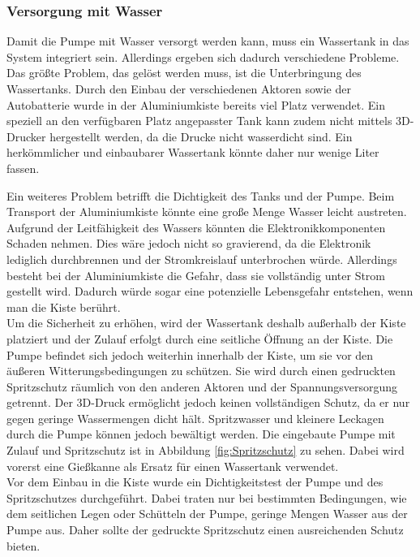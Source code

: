 \subsubsection{Versorgung mit Wasser}

Damit die Pumpe mit Wasser versorgt werden kann, muss ein Wassertank in das System integriert sein. Allerdings ergeben sich dadurch verschiedene Probleme.
\\
Das größte Problem, das gelöst werden muss, ist die Unterbringung des Wassertanks. Durch den Einbau der verschiedenen Aktoren sowie der Autobatterie wurde in der Aluminiumkiste bereits viel Platz verwendet. Ein speziell an den verfügbaren Platz angepasster Tank kann zudem nicht mittels 3D-Drucker hergestellt werden, da die Drucke nicht wasserdicht sind. Ein herkömmlicher und einbaubarer Wassertank könnte daher nur wenige Liter fassen.

Ein weiteres Problem betrifft die Dichtigkeit des Tanks und der Pumpe. Beim Transport der Aluminiumkiste könnte eine große Menge Wasser leicht austreten. Aufgrund der Leitfähigkeit des Wassers könnten die Elektronikkomponenten Schaden nehmen. Dies wäre jedoch nicht so gravierend, da die Elektronik lediglich durchbrennen und der Stromkreislauf unterbrochen würde. Allerdings besteht bei der Aluminiumkiste die Gefahr, dass sie vollständig unter Strom gestellt wird. Dadurch würde sogar eine potenzielle Lebensgefahr entstehen, wenn man die Kiste berührt.
\\
Um die Sicherheit zu erhöhen, wird der Wassertank deshalb außerhalb der Kiste platziert und der Zulauf erfolgt durch eine seitliche Öffnung an der Kiste. Die Pumpe befindet sich jedoch weiterhin innerhalb der Kiste, um sie vor den äußeren Witterungsbedingungen zu schützen. Sie wird durch einen gedruckten Spritzschutz räumlich von den anderen Aktoren und der Spannungsversorgung getrennt. Der 3D-Druck ermöglicht jedoch keinen vollständigen Schutz, da er nur gegen geringe Wassermengen dicht hält. Spritzwasser und kleinere Leckagen durch die Pumpe können jedoch bewältigt werden. Die eingebaute Pumpe mit Zulauf und Spritzschutz ist in Abbildung \ref{fig:Spritzschutz} zu sehen. Dabei wird vorerst eine Gießkanne als Ersatz für einen Wassertank verwendet.
\\
Vor dem Einbau in die Kiste wurde ein Dichtigkeitstest der Pumpe und des Spritzschutzes durchgeführt. Dabei traten nur bei bestimmten Bedingungen, wie dem seitlichen Legen oder Schütteln der Pumpe, geringe Mengen Wasser aus der Pumpe aus. Daher sollte der gedruckte Spritzschutz einen ausreichenden Schutz bieten.

